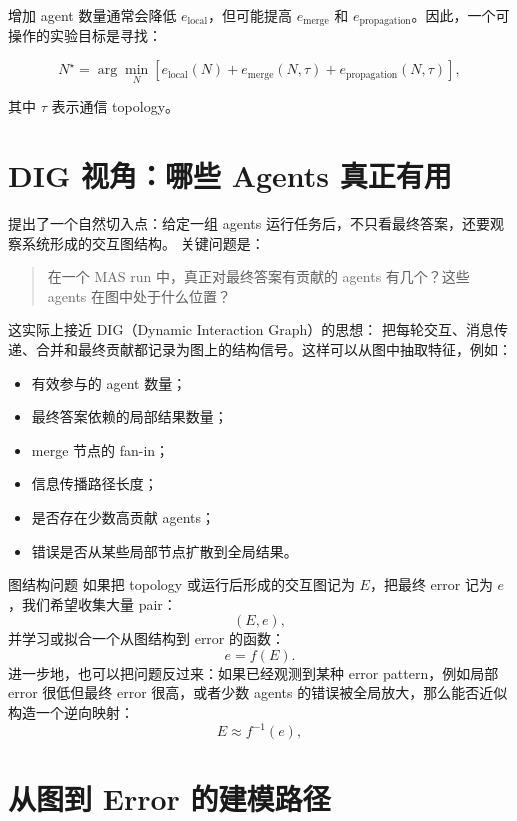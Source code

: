 \documentclass[UTF8,11pt,a4paper,fontset=fandol]{ctexart}
\begin{document}
增加 agent 数量通常会降低 \(e_{\mathrm{local}}\)，但可能提高 \(e_{\mathrm{merge}}\) 和 \(e_{\mathrm{propagation}}\)。因此，一个可操作的实验目标是寻找：

\[
N^\star
=
\arg\min_N
\left[
e_{\mathrm{local}}(N)
+
e_{\mathrm{merge}}(N,\tau)
+
e_{\mathrm{propagation}}(N,\tau)
\right],
\]

其中 \(\tau\) 表示通信 topology。

\section{DIG 视角：哪些 Agents 真正有用}

提出了一个自然切入点：给定一组 agents 运行任务后，不只看最终答案，还要观察系统形成的交互图结构。
关键问题是：

\begin{quote}
在一个 MAS run 中，真正对最终答案有贡献的 agents 有几个？这些 agents 在图中处于什么位置？
\end{quote}

这实际上接近 DIG（Dynamic Interaction Graph）的思想：
把每轮交互、消息传递、合并和最终贡献都记录为图上的结构信号。这样可以从图中抽取特征，例如：

\begin{itemize}
  \item 有效参与的 agent 数量；
  \item 最终答案依赖的局部结果数量；
  \item merge 节点的 fan-in；
  \item 信息传播路径长度；
  \item 是否存在少数高贡献 agents；
  \item 错误是否从某些局部节点扩散到全局结果。
\end{itemize}

\begin{keybox}{图结构问题}
如果把 topology 或运行后形成的交互图记为 \(E\)，把最终 error 记为 \(e\)，我们希望收集大量 pair：
\[
(E,e),
\]
并学习或拟合一个从图结构到 error 的函数：
\[
e=f(E).
\]
进一步地，也可以把问题反过来：如果已经观测到某种 error pattern，例如局部 error 很低但最终 error 很高，或者少数 agents 的错误被全局放大，那么能否近似构造一个逆向映射：
\[
E \approx f^{-1}(e),
\]

\end{keybox}

\section{从图到 Error 的建模路径}
\end{document}
